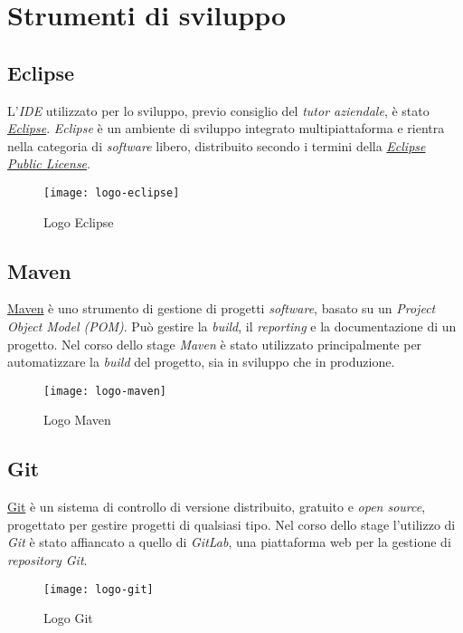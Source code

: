 \newpage
\section{Strumenti di sviluppo}
\label{strum}

\subsection{Eclipse}
\label{eclipse}
L'\textit{IDE} utilizzato per lo sviluppo, previo consiglio del \textit{tutor aziendale}, è stato \textit{\href{https://www.eclipse.org/}{Eclipse}}.
\textit{Eclipse} è un ambiente di sviluppo integrato multipiattaforma e rientra nella categoria di \textit{software} libero, distribuito secondo i termini della \textit{\href{https://www.eclipse.org/legal/epl-2.0/}{Eclipse Public License}}.
\begin{figure}[h]
    \begin{center}
    \texttt{[image: logo-eclipse]}
    \caption{Logo Eclipse}
    \label{fig:figure10}
    \end{center}
\end{figure}

\subsection{Maven}
\label{maven}
\href{https://maven.apache.org/}{Maven} è uno strumento di gestione di progetti \textit{software}, basato su un \textit{Project Object Model (POM)}. Può gestire la \textit{build}, il \textit{reporting} e la documentazione di un progetto. Nel corso dello stage \textit{Maven} è stato utilizzato principalmente per automatizzare la \textit{build} del progetto, sia in sviluppo che in produzione.
\begin{figure}[h]
    \begin{center}
    \texttt{[image: logo-maven]}
    \caption{Logo Maven}
    \label{fig:figure11}
    \end{center}
\end{figure}

\subsection{Git}
\label{git}
\href{https://git-scm.com/}{Git} è un sistema di controllo di versione distribuito, gratuito e \textit{open source}, progettato per gestire progetti di qualsiasi tipo. Nel corso dello stage l'utilizzo di \textit{Git} è stato affiancato a quello di \textit{GitLab}, una piattaforma web per la gestione di \textit{repository Git}.
\begin{figure}[h]
    \begin{center}
    \texttt{[image: logo-git]}
    \caption{Logo Git}
    \label{fig:figure12}
    \end{center}
\end{figure}

